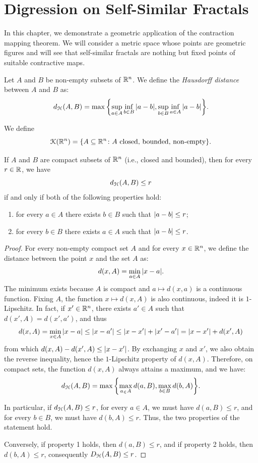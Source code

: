 \section{Digression on Self-Similar Fractals}

In this chapter, we demonstrate a geometric application of the contraction
mapping theorem. We will consider a metric space whose points are geometric
figures and will see that self-similar fractals are nothing but fixed points of
suitable contractive maps.

\begin{definition}
Let $A$ and $B$ be non-empty subsets of ${\mathbb R}^n$. We define the \emph{Hausdorff
distance}
between $A$ and $B$ as:
\[
    d_{\mathcal H}(A,B) = \max{\left\{ \sup_{a\in A}\inf_{b\in B} {\left|a-b\right|}, \sup_{b\in
  B} \inf_{a\in A} {\left|a-b\right|} \right\}}.
\]

We define
\[
 \mathcal K({\mathbb R}^n) = {\left\{ A \subseteq {\mathbb R}^n \colon \text{$A$ closed, bounded, non-empty} \right\}}.
\]
\end{definition}

\begin{theorem}
If $A$ and $B$ are compact subsets of ${\mathbb R}^n$ (i.e., closed and bounded), then
for every $r \in {\mathbb R}$, we have
\[
  d_\mathcal H(A,B) \le r
\]
if and only if both of the following properties hold:
\begin{enumerate}
\item for every $a\in A$ there exists $b\in B$ such that ${\left|a-b\right|}\le r$;
\item for every $b\in B$ there exists $a\in A$ such that ${\left|a-b\right|}\le r$.
\end{enumerate}
\end{theorem}
%
\begin{proof}
For every non-empty compact set $A$ and for every $x\in {\mathbb R}^n$, we define the
distance between the point $x$ and the set $A$ as:
\[
  d(x,A) = \min_{a\in A} {\left|x-a\right|}.
\]
The minimum exists because $A$ is compact and $a\mapsto d(x,a)$ is a continuous
function. Fixing $A$, the function $x\mapsto d(x,A)$ is also continuous, indeed
it is $1$-Lipschitz. In fact, if $x'\in {\mathbb R}^n$, there exists $a'\in A$ such that
$d(x',A) = d(x',a')$, and thus
\[
  d(x,A) = \min_{x\in A} {\left|x-a\right|} \le {\left|x-a'\right|} \le {\left|x-x'\right|} + {\left|x'- a'\right|}
   = {\left|x-x'\right|} + d(x',A)
\]
from which $d(x,A) - d(x',A)\le {\left|x-x'\right|}$. By exchanging $x$ and $x'$, we also
obtain the reverse inequality, hence the $1$-Lipschitz property of $d(x,A)$.
Therefore, on compact sets, the function $d(x,A)$ always attains a maximum, and
we have:
\[
d_\mathcal H(A,B) = \max{\left\{ \max_{a_\in A} d(a,B), \max_{b\in B} d(b,A) \right\}}.
\]

In particular, if $d_\mathcal H(A,B) \le r$, for every $a\in A$, we must have $d(a,B)
\le r$, and for every $b\in B$, we must have $d(b,A) \le r$. Thus, the two
properties of the statement hold.

Conversely, if property 1 holds, then $d(a,B)\le r$, and if property 2 holds,
then $d(b,A)\le r$, consequently $D_\mathcal H(A,B) \le r$.
\end{proof}

